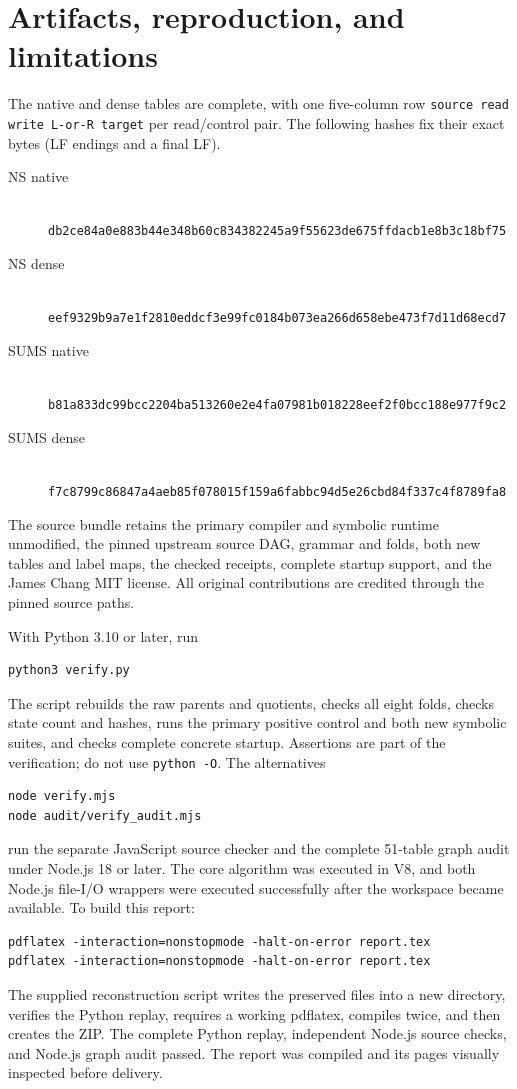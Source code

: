 \documentclass[11pt,a4paper]{article}
\begin{document}
\section{Artifacts, reproduction, and limitations}
The native and dense tables are complete, with one five-column row
\texttt{source read write L-or-R target} per read/control pair.
The following hashes fix their exact bytes (LF endings and a final LF).
\begin{description}
\item[NS native]\hfill\\
\texttt{db2ce84a0e883b44e348b60c834382245a9f55623de675ffdacb1e8b3c18bf75}
\item[NS dense]\hfill\\
\texttt{eef9329b9a7e1f2810eddcf3e99fc0184b073ea266d658ebe473f7d11d68ecd7}
\item[SUMS native]\hfill\\
\texttt{b81a833dc99bcc2204ba513260e2e4fa07981b018228eef2f0bcc188e977f9c2}
\item[SUMS dense]\hfill\\
\texttt{f7c8799c86847a4aeb85f078015f159a6fabbc94d5e26cbd84f337c4f8789fa8}
\end{description}
The source bundle retains the primary compiler and symbolic runtime
unmodified, the pinned upstream source DAG, grammar and folds, both new
tables and label maps, the checked receipts, complete startup support,
and the James Chang MIT license. All original contributions are credited
through the pinned source paths.

With Python 3.10 or later, run
\begin{verbatim}
python3 verify.py
\end{verbatim}
The script rebuilds the raw parents and quotients, checks all eight folds,
checks state count and hashes, runs the primary positive control and both
new symbolic suites, and checks complete concrete startup. Assertions
are part of the verification; do not use \texttt{python -O}.
The alternatives
\begin{verbatim}
node verify.mjs
node audit/verify_audit.mjs
\end{verbatim}
run the separate JavaScript source checker and the complete 51-table graph audit under
Node.js 18 or later. The core algorithm was executed in V8, and both Node.js file-I/O wrappers
were executed successfully after the workspace became available.
To build this report:
\begin{verbatim}
pdflatex -interaction=nonstopmode -halt-on-error report.tex
pdflatex -interaction=nonstopmode -halt-on-error report.tex
\end{verbatim}
The supplied reconstruction script writes the preserved files into a new
directory, verifies the Python replay, requires a working pdflatex,
compiles twice, and then creates the ZIP. The complete Python replay,
independent Node.js source checks, and Node.js graph audit passed.
The report was compiled and its pages visually inspected before delivery.
\end{document}
